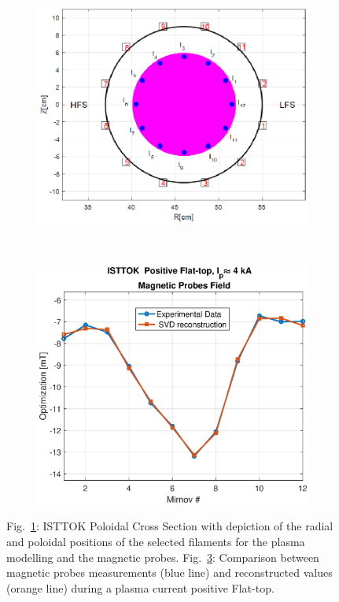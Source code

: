 \begin{figure}
	\begin{subfigure}[b]{0.45\textwidth}
		\includegraphics[width=\textwidth]{Chp4/filaments_crossSection.eps}       
		\caption{\label{filaments}}
	\end{subfigure}
	~
	\begin{subfigure}[b]{0.45\textwidth}
		\includegraphics[width=\textwidth]{Chp4/Magnetic_probes_SVD.eps} 
		\caption{\label{fig:SVDmagn} }
	\end{subfigure}
	
	\caption{Fig.~\ref{filaments}:  ISTTOK Poloidal Cross Section with depiction of the radial and poloidal positions of the selected filaments for the plasma modelling and the magnetic probes. Fig.~\ref{fig:SVDmagn}: Comparison between magnetic probes measurements (blue line) and reconstructed values (orange line) during a plasma current positive Flat-top. }
	
\end{figure}


